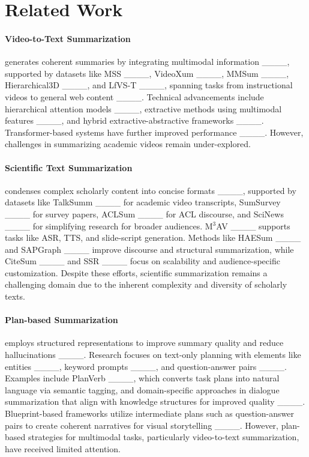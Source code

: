 \section{Related Work}
\paragraph{Video-to-Text Summarization} generates coherent summaries by integrating multimodal information ____, supported by datasets like MSS ____, VideoXum ____, MMSum ____, Hierarchical3D ____, and \mbox{LfVS-T} ____, spanning tasks from instructional videos to general web content ____. Technical advancements include hierarchical attention models ____, extractive methods using multimodal features ____, and hybrid extractive-abstractive frameworks ____. Transformer-based systems have further improved performance ____. However, challenges in summarizing academic videos remain under-explored.

\paragraph{Scientific Text Summarization} condenses complex scholarly content into concise formats ____, supported by datasets like TalkSumm ____ for academic video transcripts, SumSurvey ____ for survey papers, ACLSum ____ for ACL discourse, and SciNews ____ for simplifying research for broader audiences. M$^3$AV ____ supports tasks like ASR, TTS, and slide-script generation. Methods like HAESum ____ and SAPGraph ____ improve discourse and structural summarization, while CiteSum ____ and SSR ____ focus on scalability and audience-specific customization. Despite these efforts, scientific summarization remains a challenging domain due to the inherent complexity and diversity of scholarly texts. 

\paragraph{Plan-based Summarization} employs structured representations to improve summary quality and reduce hallucinations ____. Research focuses on text-only planning with elements like entities ____, keyword prompts ____, and question-answer pairs ____. Examples include PlanVerb ____, which converts task plans into natural language via semantic tagging, and domain-specific approaches in dialogue summarization that align with knowledge structures for improved quality ____. Blueprint-based frameworks utilize intermediate plans such as question-answer pairs to create coherent narratives for visual storytelling ____. However, plan-based strategies for multimodal tasks, particularly video-to-text summarization, have received limited attention.